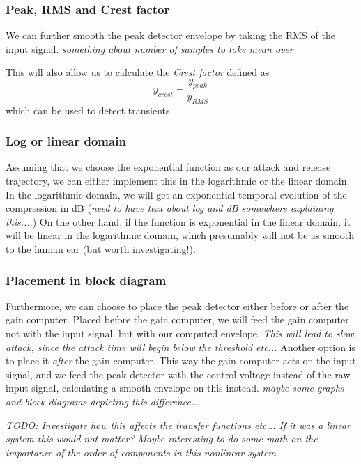 \documentclass[]{article}
\begin{document}
\subsubsection{Peak, RMS and Crest factor}
We can further smooth the peak detector envelope by taking the RMS of the input signal. \emph{something about number of samples to take mean over}

This will also allow us to calculate the \emph{Crest factor} defined as
\begin{equation}
y_{crest} = \frac{y_{peak}}{y_{RMS}}
\end{equation}
which can be used to detect transients.

\subsubsection{Log or linear domain}
Assuming that we choose the exponential function as our attack and release trajectory, we can either implement this in the logarithmic or the linear domain. In the logarithmic domain, we will get an exponential temporal evolution of the compression in dB (\emph{need to have text about log and dB somewhere explaining this...}.) On the other hand, if the function is exponential in the linear domain, it will be linear in the logarithmic domain, which presumably will not be as smooth to the human ear (but worth investigating!).

\subsubsection{Placement in block diagram}
Furthermore, we can choose to place the peak detector either before or after the gain computer. Placed before the gain computer, we will feed the gain computer not with the input signal, but with our computed envelope. \emph{This will lead to slow attack, since the attack time will begin below the threshold etc...}
Another option is to place it \emph{after} the gain computer. This way the gain computer acts on the input signal, and we feed the peak detector with the control voltage instead of the raw input signal, calculating a smooth envelope on this instead. \emph{maybe some graphs and block diagrams depicting this difference...}

\emph{TODO: Investigate how this affects the transfer functions etc... If it was a linear system this would not matter? Maybe interesting to do some math on the importance of the order of components in this nonlinear system}



\end{document}
